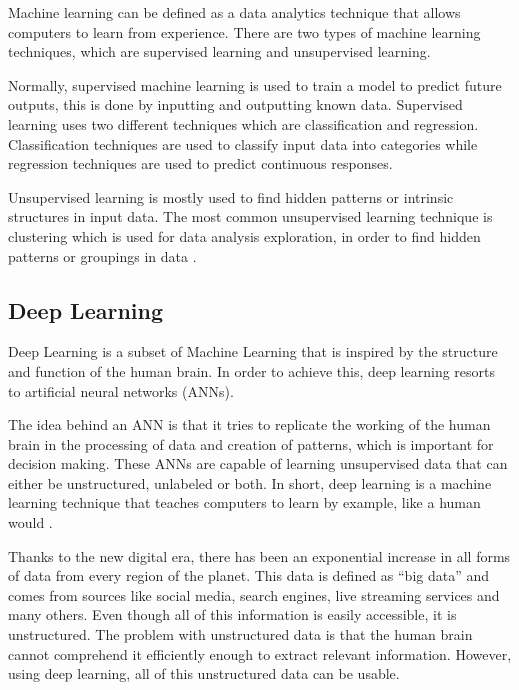    \par Machine learning can be defined as a data analytics technique that allows computers to learn from experience. There are two types of machine learning techniques, which are supervised learning and unsupervised learning.
    \par Normally, supervised machine learning is used to train a model to predict future outputs, this is done by inputting and outputting known data. Supervised learning uses two different techniques which are classification and regression. Classification techniques are used to classify input data into categories while regression techniques are used to predict continuous responses. 
    \par Unsupervised learning is mostly used to find hidden patterns or intrinsic structures in input data. The most common unsupervised learning technique is clustering which is used for data analysis exploration, in order to find hidden patterns or groupings in data \cite{mathworks_ML}.

    \subsection{Deep Learning}

    \par Deep Learning is a subset of Machine Learning that is inspired by the structure and function of the human brain. In order to achieve this, deep learning resorts to artificial neural networks (ANNs).
    
    \par The idea behind an ANN is that it tries to replicate the working of the human brain in the processing of data and creation of patterns, which is important for decision making. These ANNs are capable of learning unsupervised data that can either be unstructured, unlabeled or both. In short, deep learning is a machine learning technique that teaches computers to learn by example, like a human would \cite{mathworks_deeplearning}.


    \par Thanks to the new digital era, there has been an exponential increase in all forms of data from every region of the planet. This data is defined as \enquote{big data} and comes from sources like social media, search engines, live streaming services and many others. Even though all of this information is easily accessible, it is unstructured. The problem with unstructured data is that the human brain cannot comprehend it efficiently enough to extract relevant information. However, using deep learning, all of this unstructured data can be usable.

